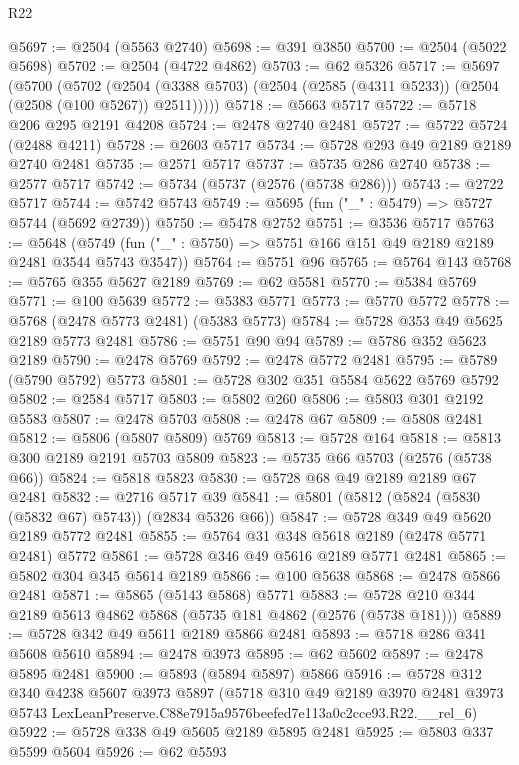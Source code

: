 \begin{lexlean}{R22}
\begin{coremodule}
@5697 := @2504 (@5563 @2740)
@5698 := @391 @3850
@5700 := @2504 (@5022 @5698)
@5702 := @2504 (@4722 @4862)
@5703 := @62 @5326
@5717 := @5697
    (@5700
      (@5702
        (@2504 (@3388 @5703) (@2504 (@2585 (@4311 @5233)) (@2504 (@2508 (@100 @5267)) @2511)))))
@5718 := @5663 @5717
@5722 := @5718 @206 @295 @2191 @4208
@5724 := @2478 @2740 @2481
@5727 := @5722 @5724 (@2488 @4211)
@5728 := @2603 @5717
@5734 := @5728 @293 @49 @2189 @2189 @2740 @2481
@5735 := @2571 @5717
@5737 := @5735 @286 @2740
@5738 := @2577 @5717
@5742 := @5734 (@5737 (@2576 (@5738 @286)))
@5743 := @2722 @5717
@5744 := @5742 @5743
@5749 := @5695 (fun ("_" : @5479) => @5727 @5744 (@5692 @2739))
@5750 := @5478 @2752
@5751 := @3536 @5717
@5763 := @5648
    (@5749 (fun ("_" : @5750) => @5751 @166 @151 @49 @2189 @2189 @2481 @3544 @5743 @3547))
@5764 := @5751 @96
@5765 := @5764 @143
@5768 := @5765 @355 @5627 @2189
@5769 := @62 @5581
@5770 := @5384 @5769
@5771 := @100 @5639
@5772 := @5383 @5771
@5773 := @5770 @5772
@5778 := @5768 (@2478 @5773 @2481) (@5383 @5773)
@5784 := @5728 @353 @49 @5625 @2189 @5773 @2481
@5786 := @5751 @90 @94
@5789 := @5786 @352 @5623 @2189
@5790 := @2478 @5769
@5792 := @2478 @5772 @2481
@5795 := @5789 (@5790 @5792) @5773
@5801 := @5728 @302 @351 @5584 @5622 @5769 @5792
@5802 := @2584 @5717
@5803 := @5802 @260
@5806 := @5803 @301 @2192 @5583
@5807 := @2478 @5703
@5808 := @2478 @67
@5809 := @5808 @2481
@5812 := @5806 (@5807 @5809) @5769
@5813 := @5728 @164
@5818 := @5813 @300 @2189 @2191 @5703 @5809
@5823 := @5735 @66 @5703 (@2576 (@5738 @66))
@5824 := @5818 @5823
@5830 := @5728 @68 @49 @2189 @2189 @67 @2481
@5832 := @2716 @5717 @39
@5841 := @5801 (@5812 (@5824 (@5830 (@5832 @67) @5743)) (@2834 @5326 @66))
@5847 := @5728 @349 @49 @5620 @2189 @5772 @2481
@5855 := @5764 @31 @348 @5618 @2189 (@2478 @5771 @2481) @5772
@5861 := @5728 @346 @49 @5616 @2189 @5771 @2481
@5865 := @5802 @304 @345 @5614 @2189
@5866 := @100 @5638
@5868 := @2478 @5866 @2481
@5871 := @5865 (@5143 @5868) @5771
@5883 := @5728 @210 @344 @2189 @5613 @4862 @5868 (@5735 @181 @4862 (@2576 (@5738 @181)))
@5889 := @5728 @342 @49 @5611 @2189 @5866 @2481
@5893 := @5718 @286 @341 @5608 @5610
@5894 := @2478 @3973
@5895 := @62 @5602
@5897 := @2478 @5895 @2481
@5900 := @5893 (@5894 @5897) @5866
@5916 := @5728
    @312
    @340
    @4238
    @5607
    @3973
    @5897
    (@5718
      @310
      @49
      @2189
      @3970
      @2481
      @3973
      @5743
      LexLeanPreserve.C88e7915a9576beefed7e113a0c2cce93.R22.__rel_6)
@5922 := @5728 @338 @49 @5605 @2189 @5895 @2481
@5925 := @5803 @337 @5599 @5604
@5926 := @62 @5593

\end{coremodule}
\end{lexlean}
